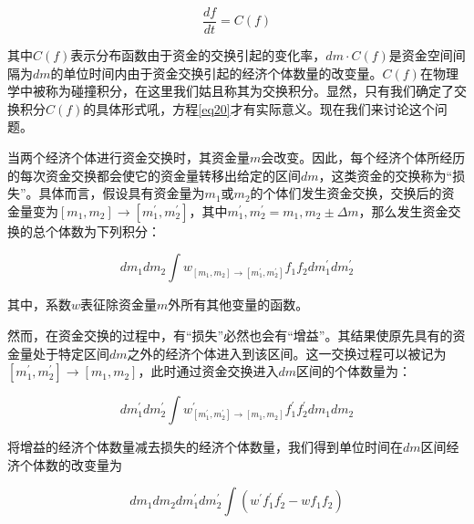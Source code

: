 \documentclass[tsinghuacite]{HustGraduPaper}
\begin{document}
		\begin{equation}
			\frac{df}{dt} = C(f) \label{eq20}
		\end{equation}
		
		\vspace{1.5em}  

		其中$C(f)$表示分布函数由于资金的交换引起的变化率，$dm \cdot C(f)$是资金空间间隔为$dm$的单位时间内由于资金交换引起的经济个体数量的改变量。$C(f)$在物理学中被称为碰撞积分，在这里我们姑且称其为交换积分。显然，只有我们确定了交换积分$C(f)$的具体形式吼，方程\eqref{eq20}才有实际意义。现在我们来讨论这个问题。
		
		当两个经济个体进行资金交换时，其资金量$m$会改变。因此，每个经济个体所经历的每次资金交换都会使它的资金量转移出给定的区间$dm$，这类资金的交换称为“损失”。具体而言，假设具有资金量为$m_1$或$m_2$的个体们发生资金交换，交换后的资金量变为$[m_1,m_2] \rightarrow [m_1^{'}, m_2^{'}]$，其中$m_1^{'}, m_2^{'} = m_1, m_2 \pm \Delta m$，那么发生资金交换的总个体数为下列积分：
		
		\begin{equation}
			dm_1 dm_2 \int  w_{[m_1,m_2] \rightarrow [m_1^{'}, m_2^{'}]}  f_1 f_2 dm_1^{'} dm_2^{'}  \label{eq21}
		\end{equation}
		
		\vspace{1.5em}  
		
		其中，系数$w$表征除资金量$m$外所有其他变量的函数。
		
		然而，在资金交换的过程中，有“损失”必然也会有“增益”。其结果使原先具有的资金量处于特定区间$dm$之外的经济个体进入到该区间。这一交换过程可以被记为$[m_1^{'},m_2^{'}] \rightarrow [m_1, m_2]$，此时通过资金交换进入$dm$区间的个体数量为：
		
		\begin{equation}
			dm_1^{'} dm_2^{'}  \int  w_{[m_1^{'},m_2^{'}] \rightarrow [m_1, m_2]}^{'}  f_1^{'} f_2^{'}  dm_1 dm_2 \label{eq22}
		\end{equation}
		
		\vspace{1.5em}  
	
	
		将增益的经济个体数量减去损失的经济个体数量，我们得到单位时间在$dm$区间经济个体数的改变量为
		
		\begin{equation}
			dm_1 dm_2 dm_1^{'} dm_2^{'} \int  ( w^{'} f_{1}^{'} f_{2}^{'} - w f_{1} f_{2} )   \label{eq23}
		\end{equation}
		
		\vspace{1.5em}  
		
\end{document}
